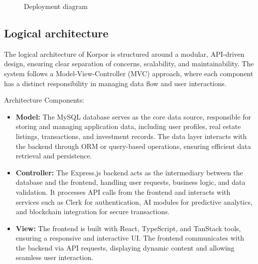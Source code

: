 \begin{figure}[htbp]
    \centering
    \caption{Deployment diagram}
    \label{fig:physical-architecture}
\end{figure}

\subsection{Logical architecture}

The logical architecture of Korpor is structured around a modular, API-driven design, ensuring clear separation of concerns, scalability, and maintainability. The system follows a Model-View-Controller (MVC) approach, where each component has a distinct responsibility in managing data flow and user interactions.

Architecture Components:
\begin{itemize}
    \item \textbf{Model:} The MySQL database serves as the core data source, responsible for storing and managing application data, including user profiles, real estate listings, transactions, and investment records. The data layer interacts with the backend through ORM or query-based operations, ensuring efficient data retrieval and persistence.
    
    \item \textbf{Controller:} The Express.js backend acts as the intermediary between the database and the frontend, handling user requests, business logic, and data validation. It processes API calls from the frontend and interacts with services such as Clerk for authentication, AI modules for predictive analytics, and blockchain integration for secure transactions.
    
    \item \textbf{View:} The frontend is built with React, TypeScript, and TanStack tools, ensuring a responsive and interactive UI. The frontend communicates with the backend via API requests, displaying dynamic content and allowing seamless user interaction.
\end{itemize}

